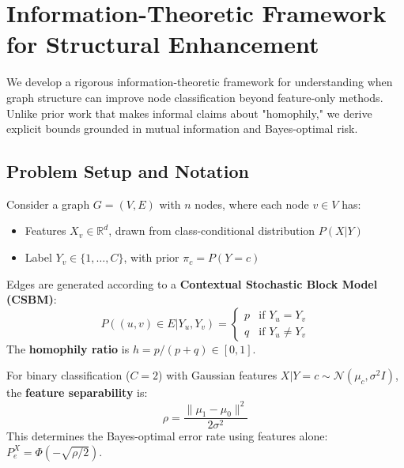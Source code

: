 
\section{Information-Theoretic Framework for Structural Enhancement}
\label{sec:budget}

We develop a rigorous information-theoretic framework for understanding when graph structure can improve node classification beyond feature-only methods. Unlike prior work that makes informal claims about "homophily," we derive explicit bounds grounded in mutual information and Bayes-optimal risk.

\subsection{Problem Setup and Notation}

\begin{definition}
\label{def:setting}
Consider a graph $G = (V, E)$ with $n$ nodes, where each node $v \in V$ has:
\begin{itemize}
    \item Features $X_v \in \mathbb{R}^d$, drawn from class-conditional distribution $P(X|Y)$
    \item Label $Y_v \in \{1, \ldots, C\}$, with prior $\pi_c = P(Y = c)$
\end{itemize}
Edges are generated according to a \textbf{Contextual Stochastic Block Model (CSBM)}:
\begin{equation}
    P((u,v) \in E | Y_u, Y_v) = \begin{cases}
        p & \text{if } Y_u = Y_v \\
        q & \text{if } Y_u \neq Y_v
    \end{cases}
\end{equation}
The \textbf{homophily ratio} is $h = p/(p+q) \in [0,1]$.
\end{definition}

\begin{definition}
\label{def:separability}
For binary classification ($C=2$) with Gaussian features $X|Y=c \sim \mathcal{N}(\mu_c, \sigma^2 I)$, the \textbf{feature separability} is:
\begin{equation}
    \rho = \frac{\|\mu_1 - \mu_0\|^2}{2\sigma^2}
\end{equation}
This determines the Bayes-optimal error rate using features alone: $P_e^{X} = \Phi(-\sqrt{\rho/2})$.
\end{definition}

